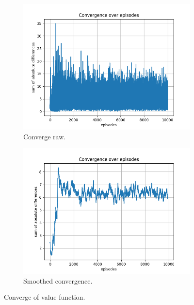\documentclass{assignment}
\begin{document}
\begin{figure}[H]
    \begin{subfigure}{0.5\textwidth}
        \includegraphics[width=\textwidth]{figures/convergence_q/epsilon_sweep/convergence_Q_alpha_0.1_gamma_0.95_epislon_0.8.png}
    \caption{Converge raw.}
    \end{subfigure}\hfill
    \begin{subfigure}{0.5\textwidth}
        \includegraphics[width=\textwidth]{figures/convergence_q/epsilon_sweep/convergence_Q_smoothed_alpha_0.1_gamma_0.95_epislon_0.8.png}
    \caption{Smoothed convergence.}
    \end{subfigure}
    \caption{Converge of value function.}
    \label{fig:epsilon_0.8_q_learning_convergence}
\end{figure}
\end{document}
